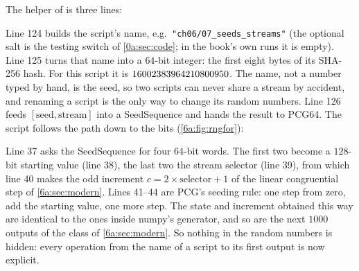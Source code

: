 The helper  of  is three lines:


Line 124 builds the script's name, e.g.\ \texttt{"ch06/07\_seeds\_streams"} (the optional salt is the
testing switch of \cref{0a:sec:code}; in the book's own runs it is empty). Line 125 turns that name into a
$64$-bit integer: the first eight bytes of its SHA-256 hash. For this script it is
$16002383964210800950$. The name, not a number typed by hand, is the seed, so two scripts
can never share a stream by accident, and renaming a script is the only way to
change its random numbers. Line 126 feeds $[\text{seed},\text{stream}]$ into a
SeedSequence and hands the result to PCG64. The script 
follows the path down to the bits (\cref{6a:fig:rngfor}):


Line 37 asks the SeedSequence for four $64$-bit words. The first two become a
$128$-bit starting value (line 38), the last two the stream selector (line 39),
from which line 40 makes the odd increment $c=2\times\text{selector}+1$ of the
linear congruential step of \cref{6a:sec:modern}. Lines 41--44 are PCG's seeding
rule: one step from zero, add the starting value, one more step. The state and
increment obtained this way are identical to the ones inside numpy's generator, and
so are the next $1000$ outputs of the  class of \cref{6a:sec:modern}.
So nothing in the random numbers is hidden: every operation from the name of a
script to its first output is now explicit.

